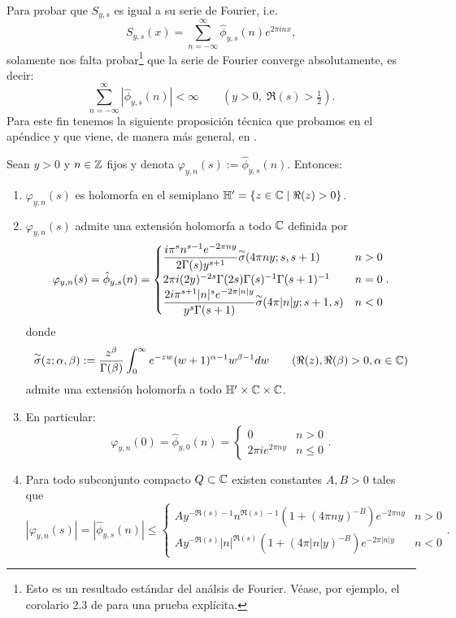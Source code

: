Para probar que $S_{y,s}$ es igual a su serie de Fourier, i.e.
\begin{equation}
  \label{eq:seriefourierS}
  S_{y,s}(x)=\sum_{n=-\infty}^{\infty}\hat{\phi}_{y,s}(n)e^{2\pi inx},
\end{equation}
solamente nos falta probar\footnote{Esto es un resultado est\'andar del
  an\'alsis de Fourier. V\'ease, por ejemplo, el corolario 2.3 de \cite{SteinFA}
para una prueba expl\'icita.} que la serie de Fourier converge absolutamente,
es decir:
\begin{equation}
  \label{eq:convabsphihat}
  \sum_{n=-\infty}^{\infty}|\hat{\phi}_{y,s}(n)|<\infty
  \qquad (y>0,\;\Re(s)>\tfrac{1}{2}).
\end{equation}
Para este fin tenemos la siguiente proposici\'on t\'ecnica que probamos en el ap\'endice
y que viene, de manera m\'as general, en \cite[\S7.2]{MiyakeMF}.

\begin{prop}\label{prop:de_phihat}
  Sean $y>0$ y $n\in\mathbb{Z}$ fijos y denota $\varphi_{y,n}(s):=\hat{\phi}_{y,s}(n)$. Entonces:
  \begin{enumerate}[label=\roman*)]
  \item $\varphi_{y,n}(s)$ es holomorfa en el semiplano $\mathbb{H}'=\{z\in\mathbb{C}\mid\Re(z)>0\}$.
  \item $\varphi_{y,n}(s)$ admite una extensi\'on holomorfa a todo $\mathbb{C}$ definida por
    \begin{equation}\label{eq:formulaphihat}
      \varphi_{y,n}(s)=\hat{\phi}_{y,s}(n)=
      \begin{cases}
        \dfrac{i\pi^sn^{s-1}e^{-2\pi ny}}{2\Gamma(s)y^{s+1}}\overset{\sim}{\sigma}(4\pi ny;s,s+1) &n>0\\
        2\pi i(2y)^{-2s}\Gamma(2s)\Gamma(s)^{-1}\Gamma(s+1)^{-1} &n=0\\
        \dfrac{2i\pi^{s+1}|n|^se^{-2\pi|n|y}}{y^s\Gamma(s+1)}\overset{\sim}{\sigma}(4\pi|n|y;s+1,s) &n<0
      \end{cases}.
    \end{equation}
    donde
    \[
      \overset{\sim}{\sigma}(z;\alpha,\beta):=\frac{z^{\beta}}{\Gamma(\beta)}\int_0^{\infty}e^{-zw}(w+1)^{\alpha-1}w^{\beta-1}dw
      \qquad(\Re(z),\Re(\beta)>0,\alpha\in\mathbb{C})
    \]
    admite  una extensi\'on holomorfa a todo $\mathbb{H}'\times\mathbb{C}\times\mathbb{C}$.
  \item\label{prop:inciso3} En particular:
    \[
      \varphi_{y,n}(0)=\hat{\phi}_{y,0}(n)=
      \begin{cases}
        0 & n>0\\
        2\pi i e^{2\pi ny} &n\leq0
      \end{cases}.
    \]
  \item\label{prop:inciso4} Para todo subconjunto compacto $Q\subset\mathbb{C}$ existen constantes $A,B>0$
    tales que
    \[
      |\varphi_{y,n}(s)|=|\hat{\phi}_{y,s}(n)|\leq
      \begin{cases}
        A y^{-\Re(s)-1}n^{\Re(s)-1}(1+(4\pi ny)^{-B})e^{-2\pi ny} & n>0\\
        A y^{-\Re(s)}|n|^{\Re(s)}(1+(4\pi |n|y)^{-B})e^{-2\pi|n|y} & n<0
      \end{cases}.
    \]
  \end{enumerate}
\end{prop}

